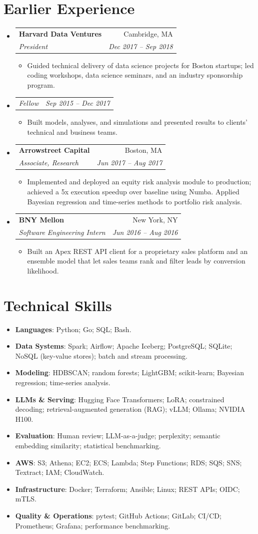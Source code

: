 \documentclass[letterpaper,11pt]{article}
\makeatletter
\newcommand{\resumeItem}[1]{\item #1}
\newcommand{\resumeSubheading}[4]{
  \needspace{5\baselineskip}\item
  \begin{tabular*}{\linewidth}{l@{\extracolsep{\fill}}r}
    \textbf{#1} & #2 \\
    \textit{\small #3} & \textit{\small #4} \\
  \end{tabular*}
}
\newcommand{\resumeSubSubheading}[2]{
  \needspace{4\baselineskip}\item
  \begin{tabular*}{\linewidth}{l@{\extracolsep{\fill}}r}
    \textit{\small #1} & \textit{\small #2} \\
  \end{tabular*}
}
\newcommand{\resumeSkill}[2]{\item\small{\textbf{#1}: #2}}
\newcommand{\resumeSubHeadingListStart}{\begin{itemize}[leftmargin=0pt,label={},itemsep=5pt,topsep=0pt,parsep=0pt]}
\newcommand{\resumeSubHeadingListEnd}{\end{itemize}}
\newcommand{\resumeItemListStart}{\begin{itemize}[leftmargin=1.2em,label=\textbullet,itemsep=3pt,topsep=3pt,parsep=0pt]\small}
\newcommand{\resumeItemListEnd}{\end{itemize}}
\newcommand{\resumeDetailListStart}{\begin{itemize}[leftmargin=0pt,label={},itemsep=3pt,topsep=3pt,parsep=0pt]}
\newcommand{\resumeDetailListEnd}{\end{itemize}}
\makeatother
\begin{document}
\newpage
\section{Earlier Experience}
\resumeSubHeadingListStart
  \resumeSubheading
    {Harvard Data Ventures}{Cambridge, MA}
    {President}{Dec 2017 -- Sep 2018}
  \resumeItemListStart
    \resumeItem{Guided technical delivery of data science projects for Boston startups; led coding workshops, data science seminars, and an industry sponsorship program.}
  \resumeItemListEnd
  \resumeSubSubheading{Fellow}{Sep 2015 -- Dec 2017}
  \resumeItemListStart
    \resumeItem{Built models, analyses, and simulations and presented results to clients' technical and business teams.}
  \resumeItemListEnd

  \vspace{3pt}
  \resumeSubheading
    {Arrowstreet Capital}{Boston, MA}
    {Associate, Research}{Jun 2017 -- Aug 2017}
  \resumeItemListStart
    \resumeItem{Implemented and deployed an equity risk analysis module to production; achieved a 5x execution speedup over baseline using Numba. Applied Bayesian regression and time-series methods to portfolio risk analysis.}
  \resumeItemListEnd

  \vspace{3pt}
  \resumeSubheading
    {BNY Mellon}{New York, NY}
    {Software Engineering Intern}{Jun 2016 -- Aug 2016}
  \resumeItemListStart
    \resumeItem{Built an Apex REST API client for a proprietary sales platform and an ensemble model that let sales teams rank and filter leads by conversion likelihood.}
  \resumeItemListEnd
\resumeSubHeadingListEnd

\section{Technical Skills}
\resumeDetailListStart
  \resumeSkill{Languages}{Python; Go; SQL; Bash.}
  \resumeSkill{Data Systems}{Spark; Airflow; Apache Iceberg; PostgreSQL; SQLite; NoSQL (key-value stores); batch and stream processing.}
  \resumeSkill{Modeling}{HDBSCAN; random forests; LightGBM; scikit-learn; Bayesian regression; time-series analysis.}
  \resumeSkill{LLMs \& Serving}{Hugging Face Transformers; LoRA; constrained decoding; retrieval-augmented generation (RAG); vLLM; Ollama; NVIDIA H100.}
  \resumeSkill{Evaluation}{Human review; LLM-as-a-judge; perplexity; semantic embedding similarity; statistical benchmarking.}
  \resumeSkill{AWS}{S3; Athena; EC2; ECS; Lambda; Step Functions; RDS; SQS; SNS; Textract; IAM; CloudWatch.}
  \resumeSkill{Infrastructure}{Docker; Terraform; Ansible; Linux; REST APIs; OIDC; mTLS.}
  \resumeSkill{Quality \& Operations}{pytest; GitHub Actions; GitLab; CI/CD; Prometheus; Grafana; performance benchmarking.}
\resumeDetailListEnd
\end{document}

